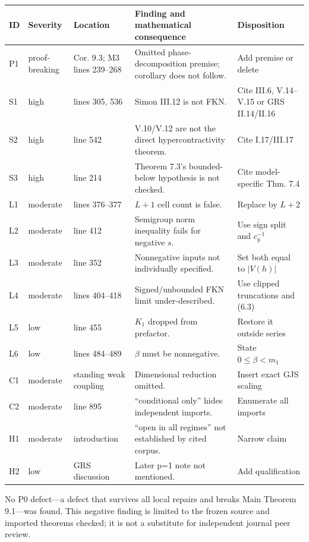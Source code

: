 \documentclass[10pt,a4paper]{article}
\begin{document}
\begin{longtable}{P{1.2cm}P{2.0cm}P{3.5cm}P{5.2cm}P{2.0cm}}
\toprule
ID & Severity & Location & Finding and mathematical consequence & Disposition\\
\midrule
\endhead
P1 & proof-breaking & Cor. 9.3; M3 lines 239--268 & Omitted phase-decomposition premise; corollary does not follow. & Add premise or delete\\
S1 & high & lines 305, 536 & Simon III.12 is not FKN. & Cite III.6, V.14--V.15 or GRS II.14/II.16\\
S2 & high & line 542 & V.10/V.12 are not the direct hypercontractivity theorem. & Cite I.17/III.17\\
S3 & high & line 214 & Theorem 7.3's bounded-below hypothesis is not checked. & Cite model-specific Thm. 7.4\\
L1 & moderate & lines 376--377 & $L+1$ cell count is false. & Replace by $L+2$\\
L2 & moderate & line 412 & Semigroup norm inequality fails for negative $s$. & Use sign split and $c_g^{-1}$\\
L3 & moderate & line 352 & Nonnegative inputs not individually specified. & Set both equal to $|V(h)|$\\
L4 & moderate & lines 404--418 & Signed/unbounded FKN limit under-described. & Use clipped truncations and (6.3)\\
L5 & low & line 455 & $K_1$ dropped from prefactor. & Restore it outside series\\
L6 & low & lines 484--489 & $\beta$ must be nonnegative. & State $0\leq\beta<m_1$\\
C1 & moderate & standing weak coupling & Dimensional reduction omitted. & Insert exact GJS scaling\\
C2 & moderate & line 895 & ``conditional only'' hides independent imports. & Enumerate all imports\\
H1 & moderate & introduction & ``open in all regimes'' not established by cited corpus. & Narrow claim\\
H2 & low & GRS discussion & Later p=1 note not mentioned. & Add qualification\\
\bottomrule
\end{longtable}

No P0 defect---a defect that survives all local repairs and breaks Main Theorem 9.1---was
found.  This negative finding is limited to the frozen source and imported theorems checked;
it is not a substitute for independent journal peer review.
\end{document}
